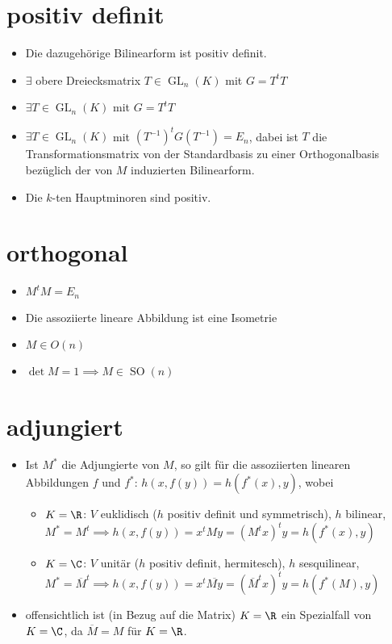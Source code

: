 \documentclass{article}
\begin{document}
    \section{positiv definit}
        \begin{itemize}
            \item Die dazugehörige Bilinearform ist positiv definit.
            \item $\exists$ obere Dreiecksmatrix  $T \in \operatorname{GL}_n(K)$ mit $G = T^tT$
            \item $\exists T \in \operatorname{GL}_n(K)$ mit $G = T^tT$
            \item $\exists T \in \operatorname{GL}_n(K)$ mit $(T^{-1})^tG(T^{-1}) = E_n$, dabei ist $T$ die Transformationsmatrix von der Standardbasis zu einer Orthogonalbasis bezüglich der von $M$ induzierten Bilinearform.
            \item Die $k$-ten Hauptminoren sind positiv.
        \end{itemize}
    \section{orthogonal}
    \begin{itemize}
        \item $M^tM = E_n$
        \item Die assoziierte lineare Abbildung ist eine Isometrie
        \item $M \in O(n)$
        \item $\det M = 1\implies M \in \operatorname{SO}(n)$
    \end{itemize}
    \section{adjungiert}
    \begin{itemize}
        \item Ist $M^*$ die Adjungierte von $M$, so gilt für die assoziierten linearen Abbildungen $f$ und $f^*$: $h(x, f(y)) = h(f^*(x), y)$, wobei
        \begin{itemize}
            \item $K = \R$: $V$ euklidisch ($h$ positiv definit und symmetrisch), $h$ bilinear, $M^* = M^t \implies h(x, f(y)) = x^t M y = (M ^t x)^t y = h(f^*(x), y)$
            \item $K = \C$: $V$ unitär ($h$ positiv definit, hermitesch), $h$ sesquilinear, $M^* = \overline{M}^t \implies h(x, f(y)) = x^t \overline{My} = (\overline{M}^tx)^ty = h(f^*(M), y)$
        \end{itemize}
        \item offensichtlich ist (in Bezug auf die Matrix) $K = \R$ ein Spezialfall von $K = \C$, da $\overline{M} = M$ für $K = \R$.
    \end{itemize}
\end{document}
